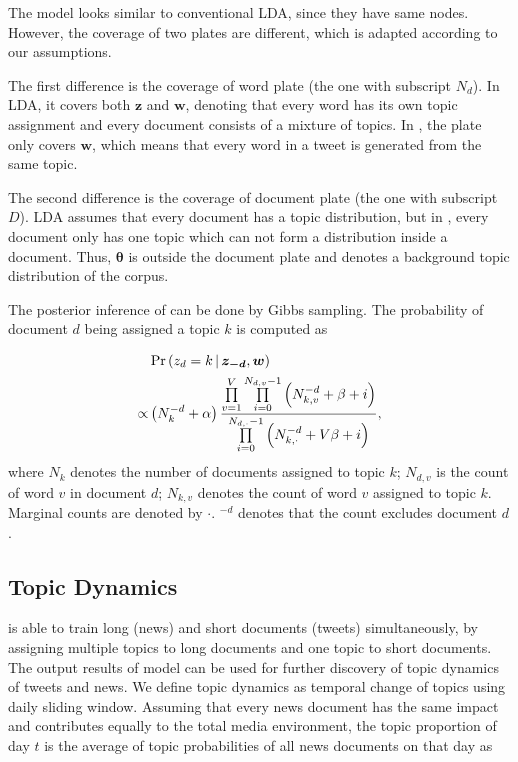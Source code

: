 The model looks similar to conventional LDA, since they have same nodes. However, the coverage of two plates are different, which is adapted according to our assumptions.

The first difference is the coverage of word plate (the one with subscript $N_d$). In LDA, it covers both $\bm{z}$ and $\bm{w}$, denoting that every word has its own topic assignment and every document consists of a mixture of topics. In \stlda, the plate only covers $\bm{w}$, which means that every word in a tweet is generated from the same topic.

The second difference is the coverage of document plate (the one with subscript $D$). LDA assumes that every document has a topic distribution, but in \stlda, every document only has one topic which can not form a distribution inside a document. Thus, $\bm{\theta}$ is outside the document plate and denotes a background topic distribution of the corpus.

The posterior inference of \stlda can be done by Gibbs sampling. The probability of document $d$ being assigned a topic $k$ is computed as

\begin{align}
&\Pr \left( z_d=k \,|\, \bm{z_{-d}},\bm{w} \right) \notag\\
\propto &\left( N_k^{-d} + \alpha \right) \frac {\prod\limits_{v=1}^{V} \prod\limits_{i=0}^{N_{d,v}-1} \left( N_{k,v}^{-d} + \beta + i \right)} {\prod\limits_{i=0}^{N_{d,\cdot}-1} \left( N_{k,\cdot}^{-d} + V\beta + i \right)},
\end{align}
where $N_k$ denotes the number of documents assigned to topic $k$; $N_{d,v}$ is the count of word $v$ in document $d$; $N_{k,v}$ denotes the count of word $v$ assigned to topic $k$. Marginal counts are denoted by $\cdot$. $^{-d}$ denotes that the count excludes document $d$.




\subsection{Topic Dynamics}
\stlda is able to train long (news) and short documents (tweets) simultaneously, by assigning multiple topics to long documents and one topic to short documents. The output results of \stlda model can be used for further discovery of topic dynamics of tweets and news. We define topic dynamics as temporal change of topics using daily sliding window. Assuming that every news document has the same impact and contributes equally to the total media environment, the topic proportion of day $t$ is the average of topic probabilities of all news documents on that day as


